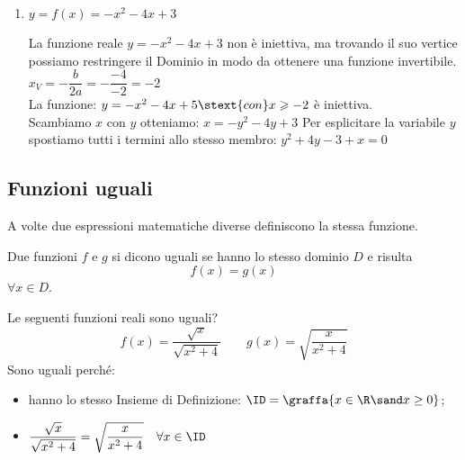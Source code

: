 \begin{esempio}
\begin{enumerate}
\pagebreak %

\item \(y = f(x) = -x^2-4x+3\)

La funzione reale
\(y=-x^2-4x+3\) non è iniettiva, ma trovando il suo vertice possiamo 
restringere il Dominio in modo da ottenere una funzione invertibile. \\[.5em]
\( x_V = -\dfrac{b}{2a} = -\dfrac{-4}{-2} = -2\) \\[.5em]
La funzione:  \quad 
\(y=-x^2-4x+5 \stext{con} x \geqslant -2\) \quad
è iniettiva. \\[.5em]
Scambiamo \(x\) con \(y\) otteniamo: \quad 
\(x = -y^2-4y+3\) 
Per esplicitare la variabile \(y\) spostiamo tutti i termini allo stesso 
membro:
\(y^2+4y-3 +x = 0\)


\end{enumerate}
\end{esempio}

\subsection{Funzioni uguali}

A volte due espressioni matematiche diverse definiscono la stessa funzione.

\begin{definizione}
Due funzioni \(f\) e \(g\) si dicono uguali se hanno lo stesso dominio \(D\) 
e risulta \[f(x)=g(x)\] \(\forall x\in D\).\\
\end{definizione}

\begin{esempio}
Le seguenti funzioni reali sono uguali?
\[f(x)=\frac{\sqrt{x}}{\sqrt{x^2+4}} \qquad g(x)=\sqrt{\frac{x}{x^2+4}}\]
Sono uguali perché:
\begin{itemize}[nosep]
\item hanno lo stesso Insieme di Definizione: 
\(\ID =\graffa{x \in \R \sand x \geq 0}\);
\item 
\(\dfrac{\sqrt{x}}{\sqrt{x^2+4}} = \sqrt{\dfrac{x}{x^2+4}} \quad 
  \forall x \in \ID\)
\end{itemize}
\end{esempio}


